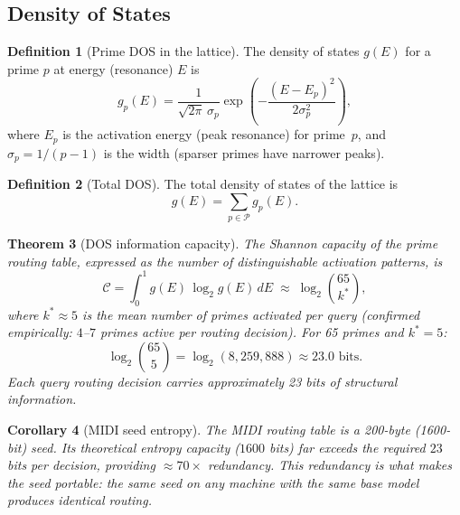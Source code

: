 \documentclass[12pt,a4paper]{article}
\theoremstyle{plain}
\newtheorem{theorem}{Theorem}[section]
\newtheorem{corollary}[theorem]{Corollary}
\theoremstyle{definition}
\newtheorem{definition}[theorem]{Definition}
\theoremstyle{remark}
\begin{document}
\subsection{Density of States}

\begin{definition}[Prime DOS in the lattice]
The density of states $g(E)$ for a prime $p$ at energy (resonance)
$E$ is
\begin{equation}
g_p(E) = \frac{1}{\sqrt{2\pi}\,\sigma_p}
         \exp\!\left(-\frac{(E - E_p)^2}{2\sigma_p^2}\right),
\label{eq:dos-gauss}
\end{equation}
where $E_p$ is the activation energy (peak resonance) for prime~$p$,
and $\sigma_p = 1/(p-1)$ is the width (sparser primes have narrower peaks).
\end{definition}

\begin{definition}[Total DOS]
The total density of states of the lattice is
\begin{equation}
g(E) = \sum_{p \in \mathcal{P}} g_p(E).
\end{equation}
\end{definition}

\begin{theorem}[DOS information capacity]
\label{thm:dos-capacity}
The Shannon capacity of the prime routing table, expressed as the
number of distinguishable activation patterns, is
\begin{equation}
\mathcal{C} = \int_0^1 g(E)\, \log_2 g(E)\, dE
\;\approx\; \log_2 \binom{65}{k^*},
\label{eq:dos-capacity}
\end{equation}
where $k^* \approx 5$ is the mean number of primes activated per query
(confirmed empirically: $4$--$7$ primes active per routing decision).
For 65 primes and $k^*=5$:
\begin{equation}
\log_2\binom{65}{5} = \log_2(8{,}259{,}888) \approx 23.0 \text{ bits}.
\end{equation}
Each query routing decision carries approximately 23 bits of structural
information.
\end{theorem}

\begin{corollary}[MIDI seed entropy]
The MIDI routing table is a 200-byte (1600-bit) seed.  Its theoretical
entropy capacity ($1600$ bits) far exceeds the required $23$ bits per
decision, providing $\approx 70\times$ redundancy.  This redundancy is
what makes the seed \emph{portable}: the same seed on any machine with
the same base model produces identical routing.
\end{corollary}
\end{document}
